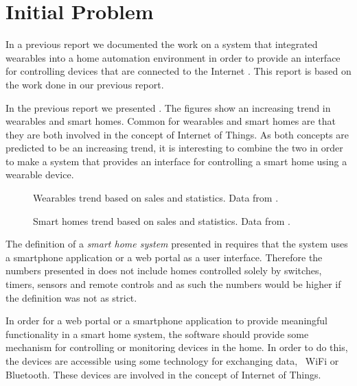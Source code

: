 \section{Initial Problem}
\label{sec:initproblem}

In a previous report we documented the work on a system that integrated wearables into a home automation environment in order to provide an interface for controlling devices that are connected to the Internet \cite{prespecialisation}. This report is based on the work done in our previous report.

In the previous report \cite[pp. 1-4]{prespecialisation} we presented . The figures show an increasing trend in wearables and smart homes. Common for wearables and smart homes are that they are both involved in the concept of Internet of Things. As both concepts are predicted to be an increasing trend, it is interesting to combine the two in order to make a system that provides an interface for controlling a smart home using a wearable device.

\begin{figure}[!hbt]
  \centering
  
  \caption{Wearables trend based on sales and statistics. Data from \protect\cite{WEARABLESTRENDNUMBERS}.}
  \label{fig:wearables-trend}
\end{figure}

\begin{figure}[!hbt]
  \centering
  
  \caption{Smart homes trend based on sales and statistics. Data from \protect\cite{SMARTHOMETREND}.}
  \label{fig:smarthomestrend}
\end{figure}

The definition of a \emph{smart home system} presented in \cite{SMARTHOMETREND} requires that the system uses a smartphone application or a web portal as a user interface. Therefore the numbers presented in  does not include homes controlled solely by switches, timers, sensors and remote controls and as such the numbers would be higher if the definition was not as strict.

In order for a web portal or a smartphone application to provide meaningful functionality in a smart home system, the software should provide some mechanism for controlling or monitoring devices in the home. In order to do this, the devices are accessible using some technology for exchanging data, \eg~WiFi or Bluetooth. These devices are involved in the concept of Internet of Things. 

